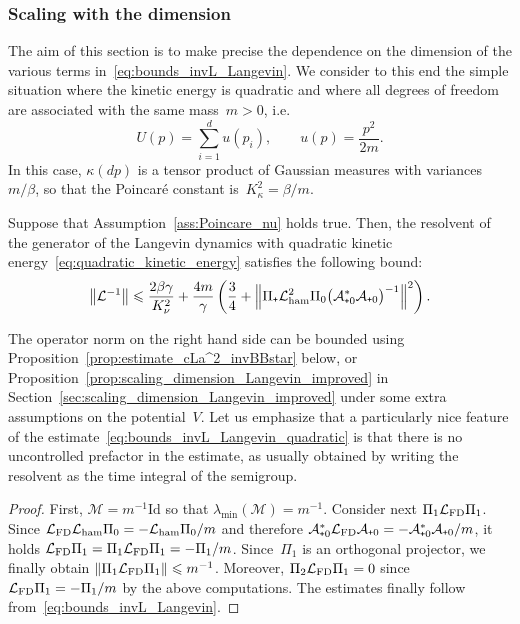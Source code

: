 \documentclass[AHL,Unicode,longabstracts,MathTools,published]{cedram}
\newcommand{\Id}{\mathrm{Id}}
\newcommand{\cL}{\mathcal{L}}
\newcommand{\cLa}{\mathcal{A}}
\newcommand{\cLM}{\mathcal{M}}
\newcommand{\cLham}{\mathcal{L}_{\rm ham}}
\newcommand{\cLFD}{\mathcal{L}_{\rm FD}}
\newcommand{\subplus}{\textnormal{\texttt{+}}}
\renewcommand{\leq}{\leqslant}
\begin{document}
\subsubsection{Scaling with the dimension}\label{sec:scaling_dimension_Langevin}

The aim of this section is to make precise the dependence on the dimension of the various terms in~\eqref{eq:bounds_invL_Langevin}. We consider to this end the simple situation where the kinetic energy is quadratic and where all degrees of freedom are associated with the same mass~$m>0$, i.e.
\begin{equation}\label{eq:quadratic_kinetic_energy}
U(p) = \sum_{i=1}^d u(p_i), \qquad u(p) = \frac{p^2}{2m}.
\end{equation}
In this case, $\kappa(dp)$ is a tensor product of Gaussian measures with variances~$m/\beta$, so that the Poincaré constant is~$K_\kappa^2 = \beta/m$.

\begin{coro}\label{cor:Lang}
Suppose that Assumption~\ref{ass:Poincare_nu} holds true. Then, the resolvent of the generator of the Langevin dynamics with quadratic kinetic energy~\eqref{eq:quadratic_kinetic_energy} satisfies the following bound:
\begin{equation}\label{eq:bounds_invL_Langevin_quadratic}
\left\|\cL^{-1}\right\| \leq \frac{2\beta\gamma}{K_\nu^2} + \frac{4 m}{\gamma} \left(\frac34 + \left\| \Pi_\subplus \cLham^2 \Pi_0 \big(\cLa_{\subplus 0}^*\cLa_{\subplus 0}\big)^{-1} \right\|^2 \right).
\end{equation}
\end{coro}

The operator norm on the right hand side can be bounded using Proposition~\ref{prop:estimate_cLa^2_invBBstar} below, or Proposition~\ref{prop:scaling_dimension_Langevin_improved} in Section~\ref{sec:scaling_dimension_Langevin_improved} under some extra assumptions on the potential~$V$. Let us emphasize that a particularly nice feature of the estimate~\eqref{eq:bounds_invL_Langevin_quadratic} is that there is no uncontrolled prefactor in the estimate, as usually obtained by writing the resolvent as the time integral of the semigroup.

\begin{proof}
First, $\cLM = m^{-1} \Id$ so that $\lambda_{\min}(\cLM) = m^{-1}$. Consider next $\Pi_1 \cLFD \Pi_1$. Since $\cLFD \cLham \Pi_0 = -\cLham \Pi_0/m$ and therefore $\cLa_{\subplus 0}^{*}\cLFD \cLa_{\subplus 0} = -\cLa_{\subplus 0}^{*}\cLa_{\subplus 0}/m$, it holds $\cLFD\Pi_1 = \Pi_1 \cLFD \Pi_1= -\Pi_1/m$. Since~$\Pi_1$ is an orthogonal projector, we finally obtain $\|\Pi_1 \cLFD \Pi_1\| \leq m^{-1}$. Moreover, $\Pi_2 \cLFD \Pi_1 = 0$ since $\cLFD \Pi_1 = -\Pi_1/m$ by the above computations. The estimates finally follow from~\eqref{eq:bounds_invL_Langevin}.
\end{proof}
\end{document}

